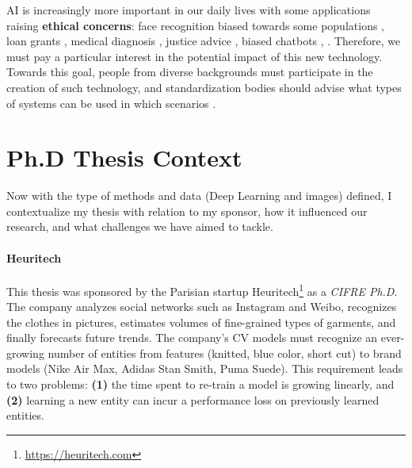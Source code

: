 \ac{AI} is increasingly more important in our daily lives with some applications raising
\textbf{ethical concerns}: face recognition biased towards some populations
\citep{grother2019facerecoethic}, loan grants \citep{anglekar2021loangrantml}, medical diagnosis
\citep{lazzazabal2020medicalbias}, justice advice \citep{russel2020justicefairness}, biased chatbots
\citep{sheng2019lmbias}, \etc. Therefore, we must pay a particular interest in the potential impact
of this new technology. Towards this goal, people from diverse backgrounds must participate in the
creation of such technology, and standardization bodies should advise what types of systems can be
used in which scenarios \citep{gebru2019aiethichandbook}.

\section{Ph.D Thesis Context}

Now with the type of methods and data (Deep Learning and images) defined, I contextualize my
thesis with relation to my sponsor, how it influenced our research, and what challenges we have aimed to tackle.

\paragraph{Heuritech} This thesis was sponsored by the Parisian startup
Heuritech\footnote{\url{https://heuritech.com}} as a \textit{CIFRE Ph.D}. The company analyzes social
networks such as Instagram and Weibo, recognizes the clothes in pictures, estimates
volumes of fine-grained types of garments, and finally forecasts future trends. The company's
\acf{CV} models must recognize an ever-growing number of entities from features (\eg knitted, blue
color, short cut) to brand models (\eg Nike Air Max, Adidas Stan Smith, Puma Suede). This
requirement leads to two problems: \textbf{(1)} the time spent to re-train a model is growing
linearly, and \textbf{(2)} learning a new entity can incur a performance loss on previously learned
entities.

